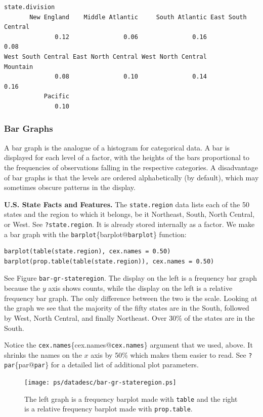 \documentclass[10pt,english]{scrbook}
\begin{document}
\begin{verbatim}
state.division
       New England    Middle Atlantic     South Atlantic East South Central 
              0.12               0.06               0.16               0.08 
West South Central East North Central West North Central           Mountain 
              0.08               0.10               0.14               0.16 
           Pacific 
              0.10
\end{verbatim}
\subsubsection[Bar Graphs]{Bar Graphs}
\label{sec-1-1-4-2}

A bar graph is the analogue of a histogram for categorical data. A bar is displayed for each level of a factor, with the heights of the bars proportional to the frequencies of observations falling in the respective categories. A disadvantage of bar graphs is that the levels are ordered alphabetically (by default), which may sometimes obscure patterns in the display. 

\begin{exampletoo}

\textbf{U.S. State Facts and Features.} The \texttt{state.region} data lists each of the 50 states and the region to which it belongs, be it Northeast, South, North Central, or West. See \texttt{?state.region}. It is already stored internally as a factor. We make a bar graph with the \texttt{barplot}\index\{barplot@\texttt{barplot}\} function: 


\begin{verbatim}
barplot(table(state.region), cex.names = 0.50)
barplot(prop.table(table(state.region)), cex.names = 0.50)
\end{verbatim}

See Figure \texttt{bar-gr-stateregion}. The display on the left is a frequency bar graph because the \(y\) axis shows counts, while the display on the left is a relative frequency bar graph. The only difference between the two is the scale. Looking at the graph we see that the majority of the fifty states are in the South, followed by West, North Central, and finally Northeast. Over 30\% of the states are in the South.

Notice the \texttt{cex.names}\index\{cex.names@\texttt{cex.names}\} argument that we used, above. It shrinks the names on the \(x\) axis by 50\% which makes them easier to read. See \texttt{?par}\index\{par@\texttt{par}\} for a detailed list of additional plot parameters.

\begin{figure}[th]
  \texttt{[image: ps/datadesc/bar-gr-stateregion.ps]}
  \caption[Bar graphs of the \texttt{state.region} data]{\small The left graph is a frequency barplot made with \texttt{table} and the right is a relative frequency barplot made with \texttt{prop.table}.}
  \label{fig-bar-gr-stateregion}
\end{figure}


\end{exampletoo}
\end{document}
